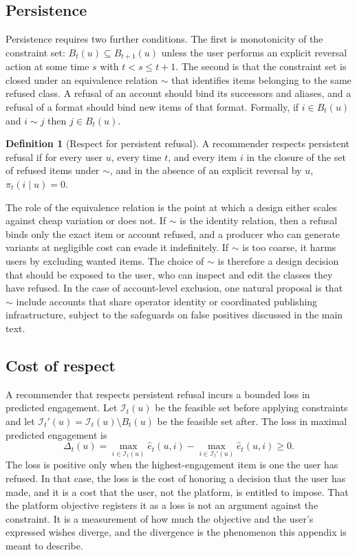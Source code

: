 \documentclass[12pt]{article}
\theoremstyle{plain}
\theoremstyle{definition}
\newtheorem{definition}{Definition}
\theoremstyle{remark}
\begin{document}
\subsection*{Persistence}

Persistence requires two further conditions. The first is monotonicity of the constraint set: $B_t(u) \subseteq B_{t+1}(u)$ unless the user performs an explicit reversal action at some time $s$ with $t < s \le t+1$. The second is that the constraint set is closed under an equivalence relation $\sim$ that identifies items belonging to the same refused class. A refusal of an account should bind its successors and aliases, and a refusal of a format should bind new items of that format. Formally, if $i \in B_t(u)$ and $i \sim j$ then $j \in B_t(u)$.

\begin{definition}[Respect for persistent refusal]
A recommender respects persistent refusal if for every user $u$, every time $t$, and every item $i$ in the closure of the set of refused items under $\sim$, and in the absence of an explicit reversal by $u$, $\pi_t(i \mid u) = 0$.
\end{definition}

The role of the equivalence relation is the point at which a design either scales against cheap variation or does not. If $\sim$ is the identity relation, then a refusal binds only the exact item or account refused, and a producer who can generate variants at negligible cost can evade it indefinitely. If $\sim$ is too coarse, it harms users by excluding wanted items. The choice of $\sim$ is therefore a design decision that should be exposed to the user, who can inspect and edit the classes they have refused. In the case of account-level exclusion, one natural proposal is that $\sim$ include accounts that share operator identity or coordinated publishing infrastructure, subject to the safeguards on false positives discussed in the main text.

\subsection*{Cost of respect}

A recommender that respects persistent refusal incurs a bounded loss in predicted engagement. Let $\mathcal{I}_t(u)$ be the feasible set before applying constraints and let $\mathcal{I}_t'(u) = \mathcal{I}_t(u) \setminus B_t(u)$ be the feasible set after. The loss in maximal predicted engagement is
\[
\Delta_t(u) = \max_{i \in \mathcal{I}_t(u)} \hat e_t(u,i) - \max_{i \in \mathcal{I}_t'(u)} \hat e_t(u,i) \ge 0 .
\]
The loss is positive only when the highest-engagement item is one the user has refused. In that case, the loss is the cost of honoring a decision that the user has made, and it is a cost that the user, not the platform, is entitled to impose. That the platform objective registers it as a loss is not an argument against the constraint. It is a measurement of how much the objective and the user's expressed wishes diverge, and the divergence is the phenomenon this appendix is meant to describe.
\end{document}
